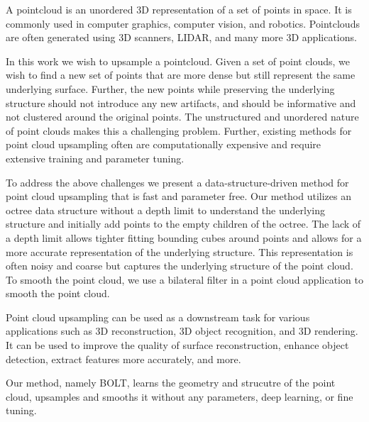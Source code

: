 A pointcloud is an unordered 3D representation of a set of points in space.
It is commonly used in computer graphics, computer vision, and robotics.
Pointclouds are often generated using 3D scanners, LIDAR, and many more 3D applications.

In this work we wish to upsample a pointcloud. Given a set of point clouds, we wish to find a new set of points that are more dense but still represent the same underlying surface.
Further, the new points while preserving the underlying structure should not introduce any new artifacts, and should be informative and not clustered around the original points.
The unstructured and unordered nature of point clouds makes this a challenging problem. 
Further, existing methods for point cloud upsampling often are computationally expensive and require extensive training and parameter tuning. 

To address the above challenges we present a data-structure-driven method for point cloud upsampling that is fast and parameter free. 
Our method utilizes an octree data structure without a depth limit to understand the underlying structure and initially add points to the empty children of the octree.
The lack of a depth limit allows tighter fitting bounding cubes around points and allows for a more accurate representation of the underlying structure.
This representation is often noisy and coarse but captures the underlying structure of the point cloud. 
To smooth the point cloud, we use a bilateral filter in a point cloud application \cite{3d_bilateral_filter_ipol} to smooth the point cloud.

Point cloud upsampling can be used as a downstream task for various applications such as 3D reconstruction, 3D object recognition, and 3D rendering. 
It can be used to improve the quality of surface reconstruction, enhance object detection, extract features more accurately, and more. 

Our method, namely BOLT, learns the geometry and strucutre of the point cloud, upsamples and smooths it without any parameters, deep learning, or fine tuning.
